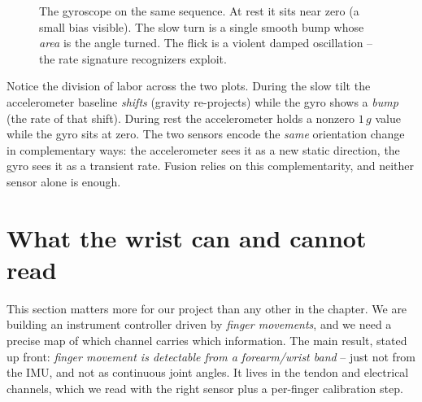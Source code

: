 \begin{figure}[H]
\centering
{}
\caption{The gyroscope on the same sequence. At rest it sits near zero (a small bias
visible). The slow turn is a single smooth bump whose \emph{area} is the angle turned.
The flick is a violent damped oscillation -- the rate signature recognizers exploit.}
\label{ch34:fig-wrist-gyro}
\end{figure}

\begin{happeningbox}
Notice the division of labor across the two plots. During the slow tilt the
accelerometer baseline \emph{shifts} (gravity re-projects) while the gyro shows a
\emph{bump} (the rate of that shift). During rest the accelerometer holds a nonzero
$1\,g$ value while the gyro sits at zero. The two sensors encode the \emph{same}
orientation change in complementary ways: the accelerometer sees it as a new static
direction, the gyro sees it as a transient rate. Fusion relies on this complementarity,
and neither sensor alone is enough.
\end{happeningbox}

\section{What the wrist can and cannot read}
\label{ch34:limits}

This section matters more for our project than any other in the chapter. We are building an instrument controller driven by \emph{finger
movements}, and we need a precise map of which channel carries which information. The
main result, stated up front:
\emph{finger movement is detectable from a forearm/wrist band} -- just not from the IMU,
and not as continuous joint angles. It lives in the tendon and electrical channels,
which we read with the right sensor plus a per-finger calibration step.

